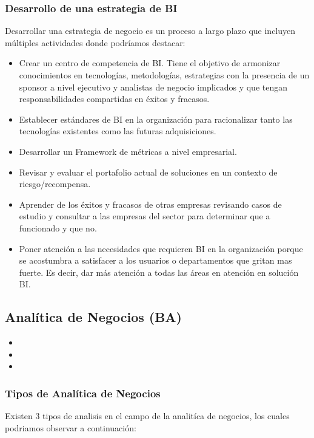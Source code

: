 \documentclass[preprint,12pt]{elsarticle}
\begin{document}
	\subsubsection{\textbf{Desarrollo de una estrategia de BI}}
	Desarrollar una estrategia de negocio es un proceso a largo plazo que incluyen múltiples actividades donde podríamos destacar:

	\begin{itemize}
	\item Crear un centro de competencia de BI. Tiene el objetivo de armonizar conocimientos en tecnologías, metodologías, estrategias 
	con la presencia de un sponsor a nivel ejecutivo y analistas de negocio implicados y que tengan responsabilidades compartidas en 
	éxitos y fracasos.
	\item Establecer estándares de BI en la organización para racionalizar tanto las tecnologías existentes como las futuras adquisiciones.
	\item Desarrollar un Framework de métricas a nivel empresarial.
	\item Revisar y evaluar el portafolio actual de soluciones en un contexto de riesgo/recompensa.
	\item Aprender de los éxitos y fracasos de otras empresas revisando casos de estudio y consultar a las empresas del sector para 
	determinar que a funcionado y que no.
	\item Poner atención a las necesidades que requieren BI en la organización porque se acostumbra a satisfacer a los usuarios o 
	departamentos que gritan mas fuerte. Es decir, dar más atención a todas las áreas en atención en solución BI.
	
	\end{itemize}



	\subsection{\textbf{Analítica de Negocios (BA) }}
	
	\begin{itemize}
	\item  
	\item  
	\item 
	\end{itemize}


	\subsubsection{\textbf{Tipos de Analítica de Negocios}}
	Existen 3 tipos de analisis en el campo de la analitíca de negocios, los cuales podriamos observar a continuación:
\end{document}
